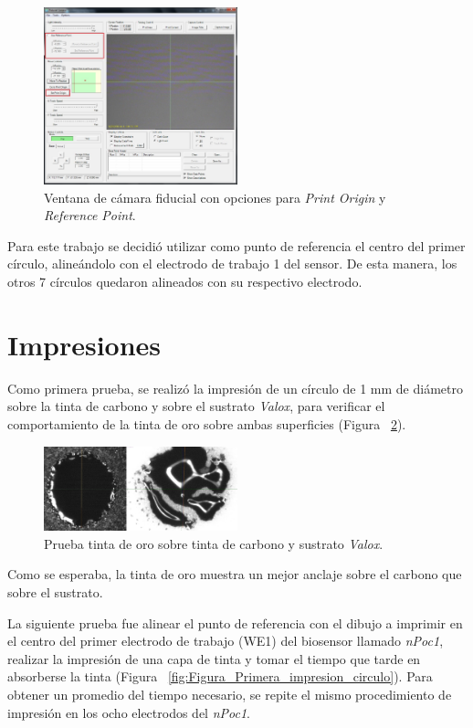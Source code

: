 \begin{figure}[H]
  \centering
    \includegraphics[width=0.5\textwidth]{Figuras/Figura_Ventana_Camara_Fiducial}
  \caption{Ventana de cámara fiducial con opciones para \textit{Print Origin} y \textit{Reference Point}.}
  \label{fig:Figura_Ventana_Camara_Fiducial}
\end{figure}

Para este trabajo se decidió utilizar como punto de referencia el centro del primer círculo, alineándolo con el electrodo de trabajo 1 del sensor. De esta manera, los otros 7 círculos quedaron alineados con su respectivo electrodo.

\section{Impresiones}
Como primera prueba, se realizó la impresión de un círculo de 1 mm de diámetro sobre la tinta de carbono y sobre el sustrato \textit{Valox}, para verificar el comportamiento de la tinta de oro sobre ambas superficies (Figura ~\ref{fig:Figura_Prueba_Sobre_Sustratos}).

\begin{figure}[H]
  \centering
    \includegraphics[width=0.5\textwidth]{Figuras/Figura_Prueba_Sobre_Sustratos}
  \caption{Prueba tinta de oro sobre tinta de carbono y sustrato \textit{Valox}.}
  \label{fig:Figura_Prueba_Sobre_Sustratos}
\end{figure}
Como se esperaba, la tinta de oro muestra un mejor anclaje sobre el carbono que sobre el sustrato.

La siguiente prueba fue alinear el punto de referencia con el dibujo a imprimir en el centro del primer electrodo de trabajo (WE1) del biosensor llamado \textit{nPoc1}, realizar la impresión de una capa de tinta y tomar el tiempo que tarde en absorberse la tinta (Figura ~\ref{fig:Figura_Primera_impresion_circulo}). Para obtener un promedio del tiempo necesario, se repite el mismo procedimiento de impresión en los ocho electrodos del \textit{nPoc1}.

